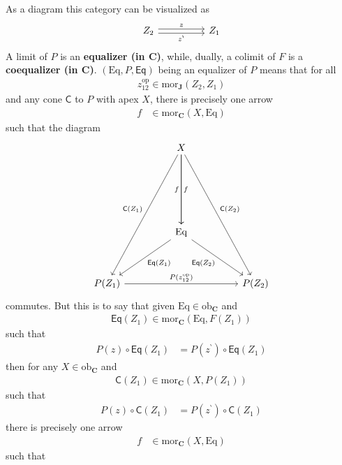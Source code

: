 \begin{exa}
\begin{enumerate}
As a diagram this category can be visualized as
\[
\begin{tikzcd}[sep=huge]
  Z_{2}
  \arrow[shift left=0.5ex]{r}{z}
  \arrow[swap,shift right=0.5ex]{r}{z^{\backprime}}
  &
  Z_{1}
\end{tikzcd}
\]
A limit of $P$ is an \textbf{equalizer (in $\mathbf{C}$)}, while, dually, a colimit of $F$ is a \textbf{coequalizer (in $\mathbf{C}$)}.
$(\mathrm{Eq},P,\mathsf{Eq})$ being an equalizer of $P$ means that for all
\begin{align*}
  z_{12}^{\mathrm{op}}
  \in
  \mathrm{mor}_{\mathbf{J}}(Z_{2},Z_{1})
\end{align*}
and any cone $\mathsf{C}$ to $P$ with apex $X$, there is precisely one arrow
\begin{align*}
  f
  &\in
  \mathrm{mor}_{\mathbf{C}}(X,\mathrm{Eq})
\end{align*}
such that the diagram
\[
\begin{tikzcd}[sep=huge]
  &
  X
  \arrow{dddr}{\mathsf{C}(Z_{2})}
  \arrow{dd}{f}
  \arrow[swap]{dd}{f}
  \arrow[swap]{dddl}{\mathsf{C}(Z_{1})}
  &
  \\
  &
  &
  \\
  &
  \mathrm{Eq}
  \arrow[swap]{dr}{\mathsf{Eq}(Z_{2})}
  \arrow{dl}{\mathsf{Eq}(Z_{1})}
  &
  \\
  P(Z_{1})
  \arrow{rr}{P(z_{12}^{\mathrm{op}})}
  &
  &
  P(Z_{2})
\end{tikzcd}
\]
commutes.
But this is to say that given $\mathrm{Eq} \in \mathrm{ob}_{\mathbf{C}}$ and
\begin{align*}
  \mathsf{Eq}(Z_{1})
  \in
  \mathrm{mor}_{\mathbf{C}}(\mathrm{Eq},F(Z_{1}))
\end{align*}
such that
\begin{align*}
  P(z)
  \circ
  \mathsf{Eq}(Z_{1})
  &=
  P(z^{\backprime})
  \circ
  \mathsf{Eq}(Z_{1})
\end{align*}
then for any $X \in \mathrm{ob}_{\mathbf{C}}$ and
\begin{align*}
  \mathsf{C}(Z_{1})
  \in
  \mathrm{mor}_{\mathbf{C}}(X,P(Z_{1}))
\end{align*}
such that
\begin{align*}
  P(z)
  \circ
  \mathsf{C}(Z_{1})
  &=
  P(z^{\backprime})
  \circ
  \mathsf{C}(Z_{1})
\end{align*}
there is precisely one arrow
\begin{align*}
  f
  &\in
  \mathrm{mor}_{\mathbf{C}}(X,\mathrm{Eq})
\end{align*}
such that
\begin{align*}

\end{align*}
\end{enumerate}
\end{exa}
